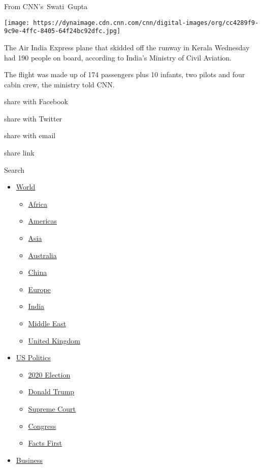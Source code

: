 From CNN's~Swati~Gupta

\texttt{[image: https://dynaimage.cdn.cnn.com/cnn/digital-images/org/cc4289f9-9c9e-4ffc-8405-64f24bc92dfc.jpg]}

The Air India Express plane that skidded off the runway in Kerala
Wednesday had 190 people on board, according to India's Ministry of
Civil Aviation.

The flight was made up of 174 passengers plus 10 infants, two pilots and
four cabin crew, the ministry told CNN.

share with Facebook

share with Twitter

share with email

share link

Search

\begin{itemize}
\tightlist
\item
  \href{/world}{World}

  \begin{itemize}
  \tightlist
  \item
    \href{/africa}{Africa}
  \item
    \href{/americas}{Americas}
  \item
    \href{/asia}{Asia}
  \item
    \href{/australia}{Australia}
  \item
    \href{/china}{China}
  \item
    \href{/europe}{Europe}
  \item
    \href{/india}{India}
  \item
    \href{/middle-east}{Middle East}
  \item
    \href{/uk}{United Kingdom}
  \end{itemize}
\item
  \href{/politics}{US Politics}

  \begin{itemize}
  \tightlist
  \item
    \href{/election/2020}{2020 Election}
  \item
    \href{/specials/politics/president-donald-trump-45}{Donald Trump}
  \item
    \href{/specials/politics/supreme-court-nine}{Supreme Court}
  \item
    \href{/specials/politics/congress}{Congress}
  \item
    \href{/specials/politics/fact-check-politics}{Facts First}
  \end{itemize}
\item
  \href{/business}{Business}


\end{itemize}
